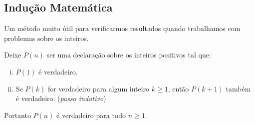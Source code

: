 \subsection{Indução Matemática}
Um método muito útil para verificarmos resultados quando trabalhamos com problemas sobre os inteiros.
\begin{theorem}
    Deixe $P(n)$ ser uma declaração sobre os inteiros positivos tal que:
    \begin{enumerate}[i.]
        \item $P(1)$ é verdadeiro.
        \item Se $P(k)$ for verdadeiro para algum inteiro $k \geq 1$, então $P(k+1)$ também é verdadeiro. (\textit{passo indutivo})
    \end{enumerate}
    Portanto $P(n)$ é verdadeiro para todo $n \geq 1 $.
\end{theorem}
